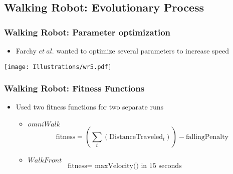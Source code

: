 \documentclass{beamer}
\begin{document}


\subsection*{Walking Robot: Evolutionary Process}
\begin{frame}
  \frametitle{Walking Robot: Parameter optimization}
\begin{itemize}
\item Farchy $et~al.$ wanted to optimize several parameters to increase speed
\end{itemize}
\begin{center}
 \texttt{[image: Illustrations/wr5.pdf]}
       \\
\end{center}
\end{frame}

\begin{frame}[fragile]
  \frametitle{Walking Robot: Fitness Functions}
\begin{itemize}
\item Used two fitness functions for two separate runs
\begin{itemize}
\item $omniWalk$ 
\[
  \textrm{fitness} = (\sum_{t} (\textrm{DistanceTraveled}_t)) - \textrm{fallingPenalty}
\]
\item $WalkFront$
\[
  \textrm{fitness} = \textrm{ maxVelocity() in 15 seconds} \qquad\qquad\quad
\]
\end{itemize}
\end{itemize}

\end{frame}
\end{document}
